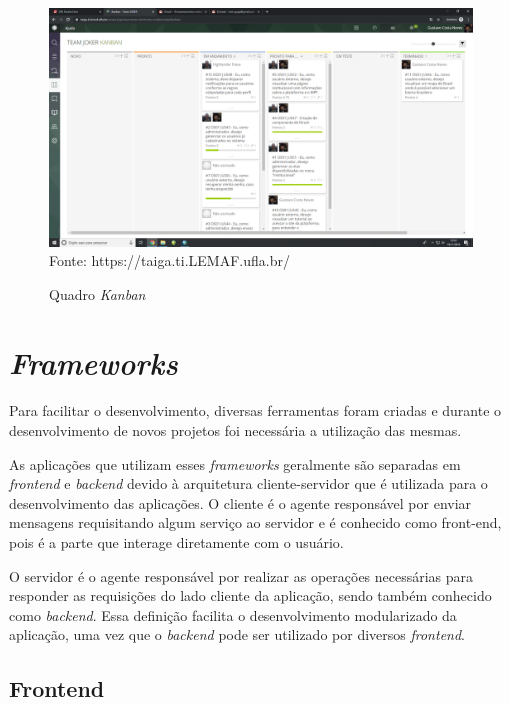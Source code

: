 \begin{figure}[H]
\centering
\caption{Quadro \textit{Kanban}} %
\includegraphics[scale=0.2]{quadroKanban}\\  %
{\small Fonte: https://taiga.ti.LEMAF.ufla.br/} %
\label{fig:kanban} %
\end{figure}

\section{\textit{Frameworks}}

Para facilitar o desenvolvimento, diversas ferramentas foram criadas e durante o desenvolvimento de novos projetos foi necessária a utilização das mesmas.

As aplicações que utilizam esses \textit{frameworks} geralmente são separadas em \textit{frontend} e \textit{backend} devido à arquitetura cliente-servidor que é utilizada para o desenvolvimento das aplicações. O cliente é o agente responsável por enviar mensagens requisitando algum serviço ao servidor e é conhecido como front-end, pois é a parte que interage diretamente com o usuário. 

O servidor é o agente responsável por realizar as operações necessárias para
responder as requisições do lado cliente da aplicação, sendo também conhecido
como \textit{backend}.
Essa definição facilita o desenvolvimento modularizado da aplicação, uma vez que o \textit{backend} pode ser utilizado por diversos \textit{frontend}.

\subsection{Frontend}

